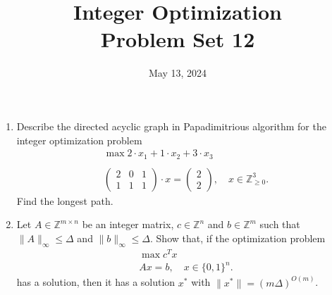 \documentclass[11pt,a4paper]{article}
\title{Integer Optimization  \\ Problem Set 12 }
\date{ May 13, 2024}
\begin{document}
\maketitle 


\begin{enumerate}
\item Describe the directed acyclic graph in Papadimitrious algorithm for the integer optimization problem
  \begin{displaymath}
    \begin{array}{c}
      \max 2 ⋅x_1 + 1 ⋅ x_2 + 3 ⋅x_3 \\ \\ 
      \begin{pmatrix}
        2 & 0 & 1\\
        1 & 1 & 1
      \end{pmatrix} ⋅x =
                \begin{pmatrix}
                  2 \\ 2
                \end{pmatrix}, \quad  x ∈ℤ_{≥0}^3. 

    \end{array}
  \end{displaymath}
  Find the longest path. 
\item Let $A ∈ ℤ^{ m ×n}$ be an integer matrix, $c ∈ ℤ^n$  and $b ∈ ℤ^m$ such that $\|A\|_∞ ≤ Δ$ and $\|b\|_∞ ≤ Δ$. Show that, if the optimization problem 
  \begin{displaymath}    
    \begin{array}{c}
    \max c^Tx \\ 
      Ax = b, \quad x ∈ \{0,1\}^n.      
    \end{array}
  \end{displaymath}
  has a solution, then it has a solution $x^*$ with $\|x^*\| = (mΔ)^{O(m)}$.


\end{enumerate}
\end{document}
